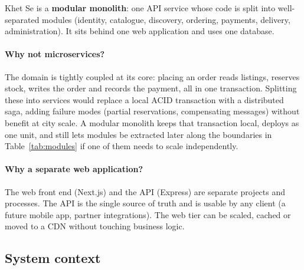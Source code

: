 \documentclass[11pt,a4paper]{article}
\begin{document}
Khet Se is a \textbf{modular monolith}: one API service whose code is split into well-separated modules (identity, catalogue, discovery, ordering, payments, delivery, administration). It sits behind one web application and uses one database.

\paragraph{Why not microservices?} The domain is tightly coupled at its core: placing an order reads listings, reserves stock, writes the order and records the payment, all in one transaction. Splitting these into services would replace a local ACID transaction with a distributed saga, adding failure modes (partial reservations, compensating messages) without benefit at city scale. A modular monolith keeps that transaction local, deploys as one unit, and still lets modules be extracted later along the boundaries in Table~\ref{tab:modules} if one of them needs to scale independently.

\paragraph{Why a separate web application?} The web front end (Next.js) and the API (Express) are separate projects and processes. The API is the single source of truth and is usable by any client (a future mobile app, partner integrations). The web tier can be scaled, cached or moved to a CDN without touching business logic.

\subsection{System context}
\end{document}
